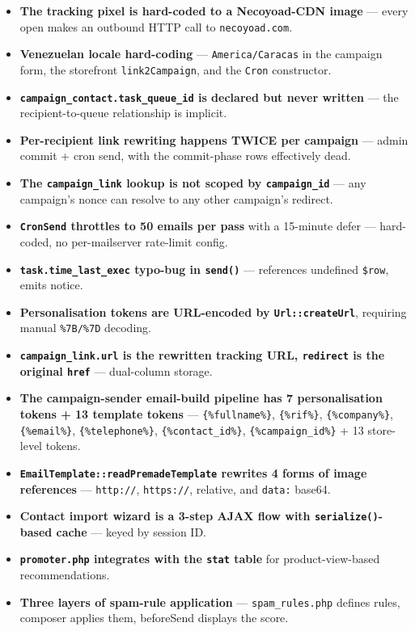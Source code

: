 \documentclass[11pt,a4paper]{article}
\begin{document}
\begin{itemize}[leftmargin=1.6em,itemsep=2pt]
  \item \textbf{The tracking pixel is hard-coded to a
        Necoyoad-CDN image} --- every open makes an outbound HTTP
        call to \texttt{necoyoad.com}.
  \item \textbf{Venezuelan locale hard-coding} ---
        \texttt{America/Caracas} in the campaign form, the
        storefront \texttt{link2Campaign}, and the
        \texttt{Cron} constructor.
  \item \textbf{\texttt{campaign\_contact.task\_queue\_id} is
        declared but never written} --- the recipient-to-queue
        relationship is implicit.
  \item \textbf{Per-recipient link rewriting happens TWICE per
        campaign} --- admin commit + cron send, with the
        commit-phase rows effectively dead.
  \item \textbf{The \texttt{campaign\_link} lookup is not scoped
        by \texttt{campaign\_id}} --- any campaign's nonce can
        resolve to any other campaign's redirect.
  \item \textbf{\texttt{CronSend} throttles to 50 emails per
        pass} with a 15-minute defer --- hard-coded, no
        per-mailserver rate-limit config.
  \item \textbf{\texttt{task.time\_last\_exec} typo-bug in
        \texttt{send()}} --- references undefined \texttt{\$row},
        emits notice.
  \item \textbf{Personalisation tokens are URL-encoded by
        \texttt{Url::createUrl}}, requiring manual
        \texttt{\%7B/\%7D} decoding.
  \item \textbf{\texttt{campaign\_link.url} is the rewritten
        tracking URL, \texttt{redirect} is the original
        \texttt{href}} --- dual-column storage.
  \item \textbf{The campaign-sender email-build pipeline has 7
        personalisation tokens + 13 template tokens} ---
        \texttt{\{\%fullname\%\}}, \texttt{\{\%rif\%\}},
        \texttt{\{\%company\%\}}, \texttt{\{\%email\%\}},
        \texttt{\{\%telephone\%\}},
        \texttt{\{\%contact\_id\%\}},
        \texttt{\{\%campaign\_id\%\}} + 13 store-level tokens.
  \item \textbf{\texttt{EmailTemplate::readPremadeTemplate}
        rewrites 4 forms of image references} ---
        \texttt{http://}, \texttt{https://}, relative, and
        \texttt{data:} base64.
  \item \textbf{Contact import wizard is a 3-step AJAX flow with
        \texttt{serialize()}-based cache} --- keyed by session ID.
  \item \textbf{\texttt{promoter.php} integrates with the
        \texttt{stat} table} for product-view-based
        recommendations.
  \item \textbf{Three layers of spam-rule application} ---
        \texttt{spam\_rules.php} defines rules, composer applies
        them, beforeSend displays the score.
\end{itemize}
\end{document}
